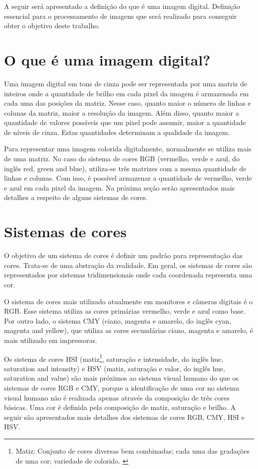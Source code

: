 \documentclass[	12pt, Times, openright, twoside, a4paper, english, brazil]{abntex2}
\begin{document}
A seguir será apresentado a definição do que é uma imagem digital. Definição essencial para o processamento de imagens que será realizado para conseguir obter o objetivo deste trabalho.

\section{O que é uma imagem digital?}

Uma imagem digital em tons de cinza pode ser representada por uma matriz de inteiros onde a quantidade de brilho em cada pixel da imagem é armazenada em cada uma das posições da matriz. Nesse caso, quanto maior o número de linhas e colunas da matriz, maior a resolução da imagem. Além disso, quanto maior a quantidade de valores possíveis que um pixel pode assumir, maior a quantidade de níveis de cinza. Estas quantidades determinam a qualidade da imagem.

Para representar uma imagem colorida digitalmente, normalmente se utiliza mais de uma matriz. No caso do sistema de cores RGB (vermelho, verde e azul, do inglês red, green and blue), utiliza-se três matrizes com a mesma quantidade de linhas e colunas. Com isso, é possível armazenar a quantidade de vermelho, verde e azul em cada pixel da imagem. Na próxima seção serão apresentados mais detalhes a respeito de alguns sistemas de cores.

\section{Sistemas de cores}

O objetivo de um sistema de cores é definir um padrão para representação das cores. Trata-se de uma abstração da realidade. Em geral, os sistemas de cores são representados por sistemas tridimensionais onde cada coordenada representa uma cor.

O sistema de cores mais utilizado atualmente em monitores e câmeras digitais é o RGB. Esse sistema utiliza as cores primárias vermelho, verde e azul como base. Por outro lado, o sistema CMY (ciano, magenta e amarelo, do inglês cyan, magenta and yellow), que utiliza as cores secundárias ciano, magenta e amarelo, é mais utilizado em impressoras. 

Os sistema de cores HSI (matiz\footnote{Matiz: Conjunto de cores diversas bem combinadas; cada uma das gradações de uma cor; variedade de colorido. \cite{aurelioonline}}, saturação e intensidade, do inglês hue, saturation and intensity) e HSV (matiz, saturação e valor, do inglês hue, saturation and value) são mais próximos ao sistema visual humano do que os sistemas de cores RGB e CMY, porque a identificação de uma cor no sistema visual humano não é realizada apenas através da composição de três cores básicas. Uma cor é definida pela composição de matiz, saturação e brilho. A seguir são apresentados mais detalhes dos sistemas de cores RGB, CMY, HSI e HSV.
\end{document}
